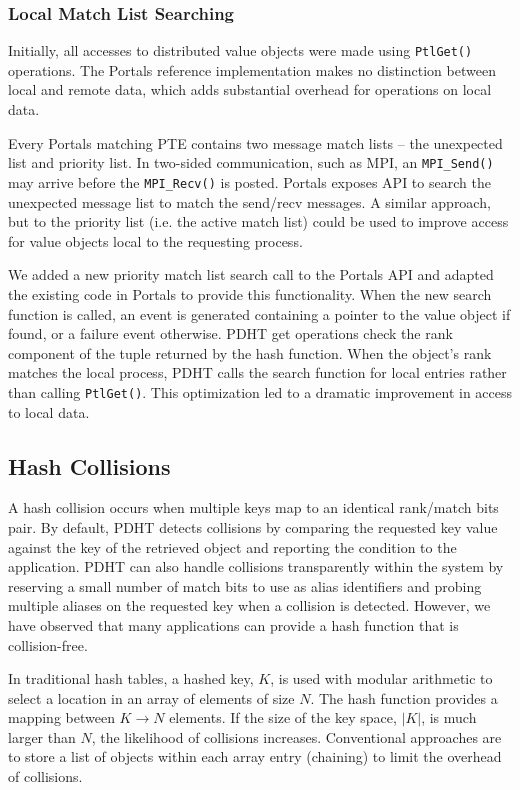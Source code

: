 \subsubsection{Local Match List Searching}

Initially, all accesses to
distributed value objects were made using {\tt PtlGet()} operations. The
Portals reference implementation makes no distinction between local and remote
data, which adds substantial overhead for operations on local data.  

Every Portals matching PTE contains two message match lists -- the unexpected
list and priority list. In two-sided communication, such as MPI, an 
{\tt MPI\_Send()} may arrive before the {\tt MPI\_Recv()} is posted. Portals
exposes API to search the unexpected message list to match the send/recv 
messages. A similar approach, but to the priority list (i.e. the active match
list) could be used to improve access for value objects local to the requesting
process.

We added a new priority match list search call to the Portals API and adapted
the existing code in Portals to provide this functionality. When the new search
function is called, an event is generated containing a pointer to the value
object if found, or a failure event otherwise. PDHT get operations check the
rank component of the tuple returned by the hash function. When the object's
rank matches the local process, PDHT calls the search function for local
entries rather than calling {\tt PtlGet()}. This optimization led to a dramatic
improvement in access to local data.

\subsection{Hash Collisions} 

A hash collision occurs when multiple keys map to an identical rank/match bits
pair. By default, PDHT detects collisions by comparing the requested key value
against the key of the retrieved object and reporting the condition to the
application. PDHT can also handle collisions transparently within the system by reserving
a small number of match bits to use as alias identifiers and probing multiple
aliases on the requested key when a collision is detected. However, we have
observed that many applications can provide a hash function that is
collision-free.

In traditional hash tables, a hashed key, $K$, is used with modular arithmetic
to select a location in an array of elements of size $N$. The hash function
provides a mapping between $K \rightarrow N$ elements.  If the size of the key
space, $|K|$, is much larger than $N$, the likelihood of collisions increases.
Conventional approaches are to store a list of objects within each array entry
(chaining) to limit the overhead of collisions.

